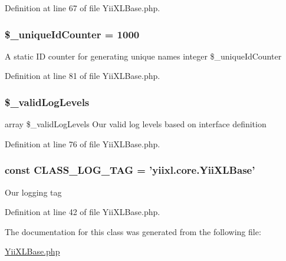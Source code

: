 Definition at line 67 of file YiiXLBase.php.

\hypertarget{classYiiXLBase_ae29325c48ae2985f2733685efb776ce9}{
\subsubsection[{\$\_\-uniqueIdCounter}]{\setlength{\rightskip}{0pt plus 5cm}\$\_\-uniqueIdCounter = 1000}}
\label{classYiiXLBase_ae29325c48ae2985f2733685efb776ce9}
A static ID counter for generating unique names  integer \$\_\-uniqueIdCounter 

Definition at line 81 of file YiiXLBase.php.

\hypertarget{classYiiXLBase_a939fa17840a3090aae1372c6c1cdb756}{
\subsubsection[{\$\_\-validLogLevels}]{\setlength{\rightskip}{0pt plus 5cm}\$\_\-validLogLevels}}
\label{classYiiXLBase_a939fa17840a3090aae1372c6c1cdb756}
array \$\_\-validLogLevels Our valid log levels based on interface definition 

Definition at line 76 of file YiiXLBase.php.

\hypertarget{classYiiXLBase_aa607ab5e557e6ebb60b85c5a20ad067f}{
\subsubsection[{CLASS\_\-LOG\_\-TAG}]{\setlength{\rightskip}{0pt plus 5cm}const {\bf CLASS\_\-LOG\_\-TAG} = 'yiixl.core.YiiXLBase'}}
\label{classYiiXLBase_aa607ab5e557e6ebb60b85c5a20ad067f}
Our logging tag 

Definition at line 42 of file YiiXLBase.php.



The documentation for this class was generated from the following file:\begin{DoxyCompactItemize}
\item 
\hyperlink{YiiXLBase_8php}{YiiXLBase.php}\end{DoxyCompactItemize}

